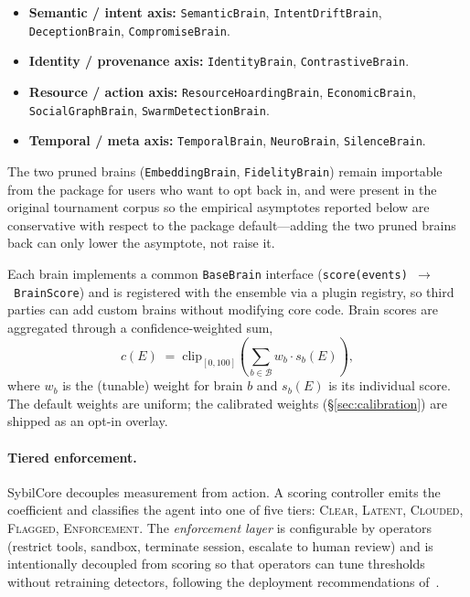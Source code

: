 \documentclass{article}
\begin{document}
\begin{itemize}
\item \textbf{Semantic / intent axis:}
  \texttt{SemanticBrain}, \texttt{IntentDriftBrain},
  \texttt{DeceptionBrain}, \texttt{CompromiseBrain}.
\item \textbf{Identity / provenance axis:}
  \texttt{IdentityBrain}, \texttt{ContrastiveBrain}.
\item \textbf{Resource / action axis:}
  \texttt{ResourceHoardingBrain}, \texttt{EconomicBrain},
  \texttt{SocialGraphBrain}, \texttt{SwarmDetectionBrain}.
\item \textbf{Temporal / meta axis:}
  \texttt{TemporalBrain}, \texttt{NeuroBrain}, \texttt{SilenceBrain}.
\end{itemize}

The two pruned brains (\texttt{EmbeddingBrain}, \texttt{FidelityBrain})
remain importable from the package for users who want to opt back in,
and were present in the original tournament corpus so the empirical
asymptotes reported below are conservative with respect to the
package default---adding the two pruned brains back can only lower the
asymptote, not raise it.

Each brain implements a common \texttt{BaseBrain} interface
(\texttt{score(events)~$\to$~BrainScore}) and is registered with the
ensemble via a plugin registry, so third parties can add custom brains
without modifying core code. Brain scores are aggregated through a
confidence-weighted sum,
\[
c(E) \;=\; \mathrm{clip}_{[0, 100]}\!\left(
  \sum_{b \in \mathcal{B}} w_b \cdot s_b(E)
\right),
\]
where $w_b$ is the (tunable) weight for brain $b$ and $s_b(E)$ is its
individual score. The default weights are uniform; the calibrated
weights (\S\ref{sec:calibration}) are shipped as an opt-in overlay.

\paragraph{Tiered enforcement.}
SybilCore decouples measurement from action. A scoring controller
emits the coefficient and classifies the agent into one of five tiers:
\textsc{Clear}, \textsc{Latent}, \textsc{Clouded}, \textsc{Flagged},
\textsc{Enforcement}. The \emph{enforcement layer} is configurable by
operators (restrict tools, sandbox, terminate session, escalate to
human review) and is intentionally decoupled from scoring so that
operators can tune thresholds without retraining detectors, following
the deployment recommendations of~\cite{controlmonitoring2025}.
\end{document}
